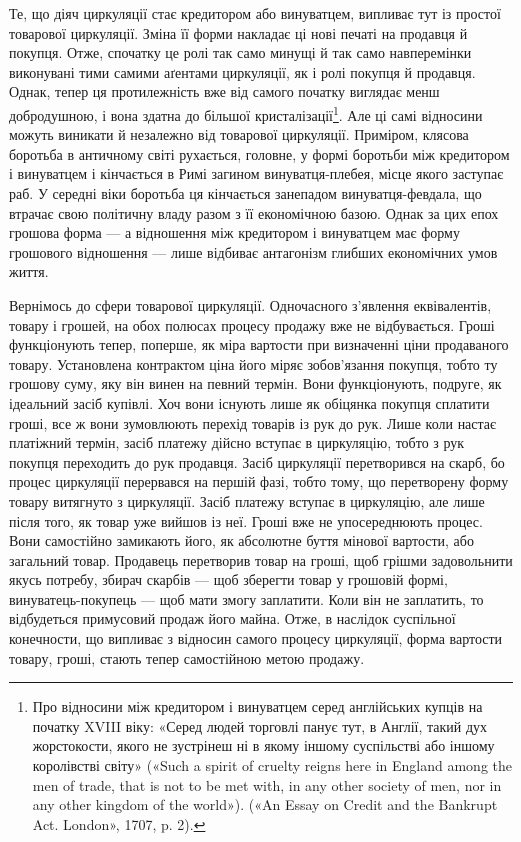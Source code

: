Те, що діяч циркуляції стає кредитором або винуватцем, випливає
тут із простої товарової циркуляції. Зміна її форми накладає ці
нові печаті на продавця й покупця. Отже, спочатку це ролі так
само минущі й так само навперемінки виконувані тими самими аґентами
циркуляції, як і ролі покупця й продавця. Однак, тепер ця
протилежність вже від самого початку виглядає менш добродушною,
і вона здатна до більшої кристалізації\footnote{
Про відносини між кредитором і винуватцем серед англійських
купців на початку XVIII віку: «Серед людей торговлі панує тут, в Англії,
такий дух жорстокости, якого не зустрінеш ні в якому іншому суспільстві
або іншому королівстві світу» («Such a spirit of cruelty reigns here
in England among the men of trade, that is not to be met with, in any other
society of men, nor in any other kingdom of the world»). («An Essay on Credit and the Bankrupt Act.
London», 1707, p. 2).
}. Але ці самі відносини
можуть виникати й незалежно від товарової циркуляції.
Приміром, клясова боротьба в античному світі рухається, головне,
у формі боротьби між кредитором і винуватцем і кінчається в
Римі загином винуватця-плебея, місце якого заступає раб. У середні
віки боротьба ця кінчається занепадом винуватця-февдала,
що втрачає свою політичну владу разом з її економічною
базою. Однак за цих епох грошова форма — а відношення між
кредитором і винуватцем має форму грошового відношення — лише
відбиває антагонізм глибших економічних умов життя.

Вернімось до сфери товарової циркуляції. Одночасного з’явлення
еквівалентів, товару і грошей, на обох полюсах процесу
продажу вже не відбувається. Гроші функціонують тепер, поперше,
як міра вартости при визначенні ціни продаваного товару.
Установлена контрактом ціна його міряє зобов’язання покупця,
тобто ту грошову суму, яку він винен на певний термін. Вони
функціонують, подруге, як ідеальний засіб купівлі. Хоч вони
існують лише як обіцянка покупця сплатити гроші, все ж вони
зумовлюють перехід товарів із рук до рук. Лише коли настає
платіжний термін, засіб платежу дійсно вступає в циркуляцію,
тобто з рук покупця переходить до рук продавця. Засіб циркуляції
перетворився на скарб, бо процес циркуляції перервався
на першій фазі, тобто тому, що перетворену форму товару витягнуто
з циркуляції. Засіб платежу вступає в циркуляцію, але
лише після того, як товар уже вийшов із неї. Гроші вже не упосереднюють
процес. Вони самостійно замикають його, як абсолютне
буття мінової вартости, або загальний товар. Продавець
перетворив товар на гроші, щоб грішми задовольнити якусь
потребу, збирач скарбів — щоб зберегти товар у грошовій
формі, винуватець-покупець — щоб мати змогу заплатити. Коли
він не заплатить, то відбудеться примусовий продаж його майна.
Отже, в наслідок суспільної конечности, що випливає з відносин
самого процесу циркуляції, форма вартости товару, гроші, стають
тепер самостійною метою продажу.

